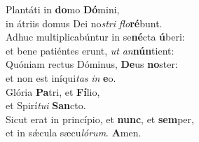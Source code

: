 \oddverse Plantáti in \textbf{do}mo \textbf{Dó}mini,~\*\\
\oddverse in átriis domus Dei no\textit{stri} \textit{flo}\textbf{ré}bunt.\\
\evenverse Adhuc multiplicabúntur in se\textbf{né}cta \textbf{ú}beri:~\*\\
\evenverse et bene patiéntes erunt, \textit{ut} \textit{an}\textbf{nún}tient:\\
\oddverse Quóniam rectus Dóminus, \textbf{De}us \textbf{no}ster:~\*\\
\oddverse et non est iníqui\textit{tas} \textit{in} \textbf{e}o.\\
\evenverse Glória \textbf{Pa}tri, et \textbf{Fí}lio,~\*\\
\evenverse et Spirí\textit{tu}\textit{i} \textbf{San}cto.\\
\oddverse Sicut erat in princípio, et \textbf{nunc}, et \textbf{sem}per,~\*\\
\oddverse et in sǽcula sæcu\textit{ló}\textit{rum}. \textbf{A}men.\\

